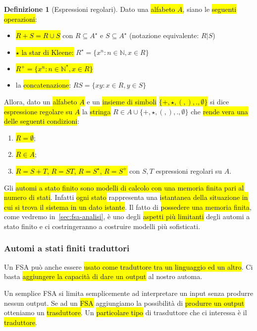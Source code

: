 \documentclass[a4paper,11pt,oneside]{article}
\theoremstyle{plain}
\theoremstyle{definition}
\newtheorem{defn}{Definizione}[section]
\theoremstyle{remark}
\begin{document}
\begin{defn}[Espressioni regolari]\label{def:regex}
  Dato una \hl{alfabeto $A$}, siano le \hl{seguenti operazioni}:

  \begin{itemize}
    \item \hl{$R + S = R \cup S$} con $R \subseteq A^\star$ e
      $S \subseteq A^\star$ (notazione equivalente: $R | S$)
    \item \hl{$\star$ la star di Kleene:}
      $R^\star = \{x^n : n \in \mathbb{N}, x \in R\}$
    \item \hl{$R^+ = \{x^n : n \in \mathbb{N}^*, x \in R\}$}
    \item la \hl{concatenazione}: $RS = \{xy : x \in R, y \in S\}$
  \end{itemize}

  Allora, dato un \hl{alfabeto $A$} e un \hl{insieme di simboli}
  \hl{$\{+,\star,(,),.,\emptyset\}$} si dice \hl{espressione regolare su $A$} la
  \hl{stringa} $R \in A \cup \{+,\star,(,),.,\emptyset\}$ che \hl{rende vera una
  delle seguenti condizioni}:

  \begin{enumerate}
    \item \hl{$R = \emptyset$};
    \item \hl{$R \in A$};
    \item \hl{$R = S + T$, $R = ST$, $R = S^\star$, $R = S^+$} con $S,T$
      espressioni regolari su $A$.
  \end{enumerate}
\end{defn}

Gli \hl{automi a stato finito sono modelli di calcolo con una memoria finita
pari al numero di stati}. Infatti \hl{ogni stato} rappresenta una \hl{istantanea
della situazione in cui si trova il sistema in un dato istante}. Il fatto di
\hl{possedere una memoria finita}, come vedremo in~\ref{sec:fsa-analisi}, è uno
degli \hl{aspetti più limitanti} degli automi a stato finito e ci costringeranno
a costruire modelli più sofisticati.

\subsubsection{Automi a stati finiti traduttori}\label{sec:fsa-trad}

Un FSA può anche essere \hl{usato come traduttore tra un linguaggio ed un
altro}. Ci basta \hl{aggiungere la capacità di dare un output} al nostro automa.

Un semplice FSA si limita semplicemente ad interpretare un input senza produrre
nessun output. Se ad un \hl{FSA} aggiungiamo la possibilità di \hl{produrre un
output} otteniamo un \hl{trasduttore}. Un \hl{particolare tipo} di trasduttore
che ci interessa è il \hl{traduttore}.
\end{document}
